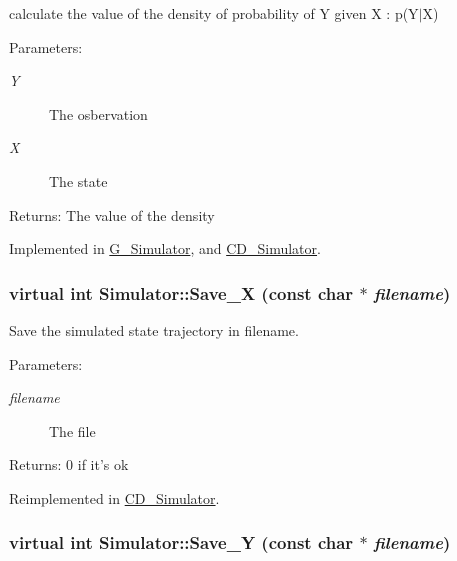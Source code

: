 calculate the value of the density of probability of Y given X : p(Y$|$X) 

\begin{Desc}
\item[Parameters:]
\begin{description}
\item[{\em Y}]The osbervation \item[{\em X}]The state\end{description}
\end{Desc}
\begin{Desc}
\item[Returns:]The value of the density \end{Desc}


Implemented in \hyperlink{class_g___simulator_6f42783322c20a0b91fab9f1e6d54363}{G\_\-Simulator}, and \hyperlink{class_c_d___simulator_905fb2ac4a72f5d7e44957fa8103cab8}{CD\_\-Simulator}.\hypertarget{class_simulator_47da05750f6f78051dcdecb5da666653}{
\subsubsection[{Save\_\-X}]{\setlength{\rightskip}{0pt plus 5cm}virtual int Simulator::Save\_\-X (const char $\ast$ {\em filename})}}
\label{class_simulator_47da05750f6f78051dcdecb5da666653}


Save the simulated state trajectory in filename. 

\begin{Desc}
\item[Parameters:]
\begin{description}
\item[{\em filename}]The file\end{description}
\end{Desc}
\begin{Desc}
\item[Returns:]0 if it's ok \end{Desc}


Reimplemented in \hyperlink{class_c_d___simulator_7d9d7bb805654ee7ee1f2235364bc19e}{CD\_\-Simulator}.\hypertarget{class_simulator_2cc53f33162bf08a6ae187ad4d34fe6e}{
\subsubsection[{Save\_\-Y}]{\setlength{\rightskip}{0pt plus 5cm}virtual int Simulator::Save\_\-Y (const char $\ast$ {\em filename})}}
\label{class_simulator_2cc53f33162bf08a6ae187ad4d34fe6e}


